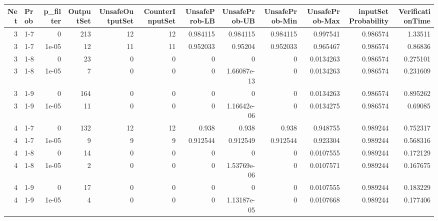 \begin{tabular}{rlrrrrrrrrrr}
\hline
   Net & Prob   &   p\_filter &   OutputSet &   UnsafeOutputSet &   CounterInputSet &   UnsafeProb-LB &   UnsafeProb-UB &   UnsafeProb-Min &   UnsafeProb-Max &   inputSet Probability &   VerificationTime \\
\hline
     3 & 1-7    &      0     &         213 &                12 &                12 &        0.984115 &     0.984115    &         0.984115 &        0.997541  &               0.986574 &           1.33511  \\
     3 & 1-7    &      1e-05 &          12 &                11 &                11 &        0.952033 &     0.95204     &         0.952033 &        0.965467  &               0.986574 &           0.86836  \\
     3 & 1-8    &      0     &          23 &                 0 &                 0 &        0        &     0           &         0        &        0.0134263 &               0.986574 &           0.275101 \\
     3 & 1-8    &      1e-05 &           7 &                 0 &                 0 &        0        &     1.66087e-13 &         0        &        0.0134263 &               0.986574 &           0.231609 \\
     3 & 1-9    &      0     &         164 &                 0 &                 0 &        0        &     0           &         0        &        0.0134263 &               0.986574 &           0.895262 \\
     3 & 1-9    &      1e-05 &          11 &                 0 &                 0 &        0        &     1.16642e-06 &         0        &        0.0134275 &               0.986574 &           0.69085  \\
     4 & 1-7    &      0     &         132 &                12 &                12 &        0.938    &     0.938       &         0.938    &        0.948755  &               0.989244 &           0.752317 \\
     4 & 1-7    &      1e-05 &           9 &                 9 &                 9 &        0.912544 &     0.912549    &         0.912544 &        0.923304  &               0.989244 &           0.568316 \\
     4 & 1-8    &      0     &          14 &                 0 &                 0 &        0        &     0           &         0        &        0.0107555 &               0.989244 &           0.172129 \\
     4 & 1-8    &      1e-05 &           2 &                 0 &                 0 &        0        &     1.53769e-06 &         0        &        0.0107571 &               0.989244 &           0.167675 \\
     4 & 1-9    &      0     &          17 &                 0 &                 0 &        0        &     0           &         0        &        0.0107555 &               0.989244 &           0.183229 \\
     4 & 1-9    &      1e-05 &           4 &                 0 &                 0 &        0        &     1.13187e-05 &         0        &        0.0107668 &               0.989244 &           0.177406 \\
\hline
\end{tabular}
